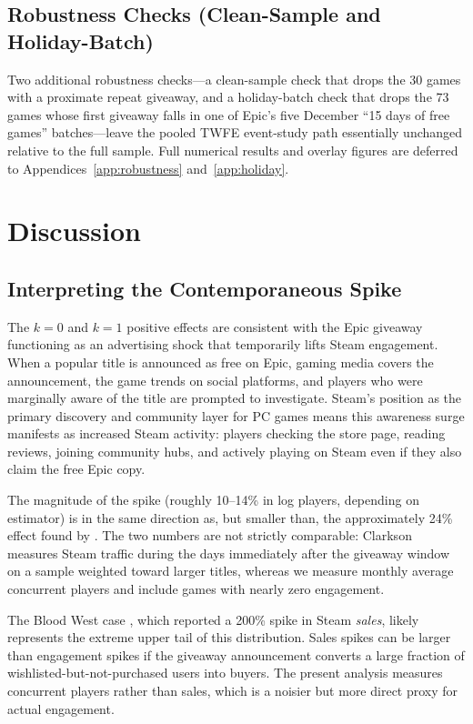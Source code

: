 \documentclass[11pt]{article}
\begin{document}
\subsection{Robustness Checks (Clean-Sample and Holiday-Batch)}

Two additional robustness checks---a clean-sample check that drops the 30 games
with a proximate repeat giveaway, and a holiday-batch check that drops the 73
games whose first giveaway falls in one of Epic's five December ``15 days of
free games'' batches---leave the pooled TWFE event-study path essentially
unchanged relative to the full sample. Full numerical results and overlay
figures are deferred to Appendices~\ref{app:robustness} and~\ref{app:holiday}.

\section{Discussion}
\label{sec:discussion}

\subsection{Interpreting the Contemporaneous Spike}

The $k = 0$ and $k = 1$ positive effects are consistent with the Epic giveaway
functioning as an advertising shock that temporarily lifts Steam engagement. When a
popular title is announced as free on Epic, gaming media covers the announcement,
the game trends on social platforms, and players who were marginally aware of the title
are prompted to investigate. Steam's
position as the primary discovery and community layer for PC games means this awareness
surge manifests as increased Steam activity: players checking the store page, reading
reviews, joining community hubs, and actively playing on Steam even if they also claim
the free Epic copy.

The magnitude of the spike (roughly 10--14\% in log players, depending on estimator)
is in the same direction as, but smaller than, the approximately 24\% effect found by
\citet{clarkson2025}. The two numbers are not strictly comparable: Clarkson measures
Steam traffic during the days immediately after the giveaway window on a sample weighted toward
larger titles, whereas we measure monthly average concurrent players and include
games with nearly zero engagement.

The Blood West case \citep{frvr2026}, which reported a 200\% spike in Steam
\textit{sales}, likely represents the extreme upper tail of this distribution.
Sales spikes can be larger than engagement spikes if the giveaway announcement
converts a large fraction of wishlisted-but-not-purchased users into buyers.
The present analysis measures concurrent players rather than sales, which is a
noisier but more direct proxy for actual engagement.
\end{document}
